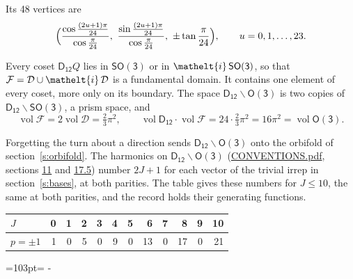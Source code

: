 \documentclass[10pt,a4paper]{article}
\newcommand{\needspace}[1]{\par\penalty-100\begingroup\dimen0=#1\relax\dimen2=\pagegoal
  \advance\dimen2-\pagetotal\ifdim\dimen0>\dimen2\relax\ifdim\dimen2>0pt\vfil\break\fi\fi
  \endgroup}
\numberwithin{equation}{section}
\newcommand{\eltfont}[1]{{\let\sigma\eltsigma\mathelt{#1}}}
\newcommand{\grp}[1]{\mathsf{#1}}
\newcommand{\elt}[1]{\eltfont{#1}}
\newcommand{\vol}{\operatorname{vol}}
\newcommand{\fcell}{\mathcal{D}}
\newcommand{\fdomain}{\mathcal{F}}
\begin{document}
\leavevmode\label{n:local.vertex.u}Its 48 vertices are
\begin{equation}\label{e:prism}\Bigl(\frac{\cos\frac{(2u+1)\pi}{24}}{\cos\frac{\pi}{24}},\ \frac{\sin\frac{(2u+1)\pi}{24}}{\cos\frac{\pi}{24}},\ \pm\tan\frac{\pi}{24}\Bigr),\qquad u = 0, 1, \dots, 23.\end{equation}

\leavevmode\label{n:set.fundamental}Every coset $\grp{D_{12}}Q$ lies in \href{SO3.pdf}{$\grp{SO(3)}$} or in $\elt{i}\,\grp{SO(3)}$, so that $\fdomain = \fcell \cup \elt{i}\,\fcell$ is a fundamental domain. It contains one element of every coset, more only on its boundary.
The space $\grp{D_{12}}\backslash\grp{O(3)}$ is two copies of $\grp{D_{12}}\backslash\grp{SO(3)}$, a prism space, and
\begin{equation}\label{e:volume}\vol\fdomain = 2\vol\fcell = \tfrac{2}{3}\pi^2,\qquad \vol\grp{D_{12}}\cdot\vol\fdomain = 24\cdot \tfrac{2}{3}\pi^2 = 16\pi^2 = \vol\grp{O(3)}.\end{equation}

Forgetting the turn about a direction sends $\grp{D_{12}}\backslash\grp{O(3)}$ onto the orbifold of section~\ref{s:orbifold}.
The harmonics on $\grp{D_{12}}\backslash\grp{O(3)}$ (\href{../../CONVENTIONS.pdf}{CONVENTIONS.pdf}, sections \href{../../CONVENTIONS.pdf\#conv.11}{11} and \href{../../CONVENTIONS.pdf\#conv.17.5}{17.5}) number $2J + 1$ for each vector of the trivial irrep in section~\ref{s:bases}, at both parities. The table gives these numbers for $J \le 10$, the same at both parities, and the record holds their generating functions.
{\small\setlength{\tabcolsep}{4pt}\begin{longtable}{@{}lrrrrrrrrrrr@{}}\toprule
$J$ & 0 & 1 & 2 & 3 & 4 & 5 & 6 & 7 & 8 & 9 & 10\\\midrule\endhead
\bottomrule\endfoot\endlastfoot
$p = \pm 1$ & 1 & 0 & 5 & 0 & 9 & 0 & 13 & 0 & 17 & 0 & 21\\
\bottomrule\end{longtable}}
\needspace{103pt}
\end{document}
